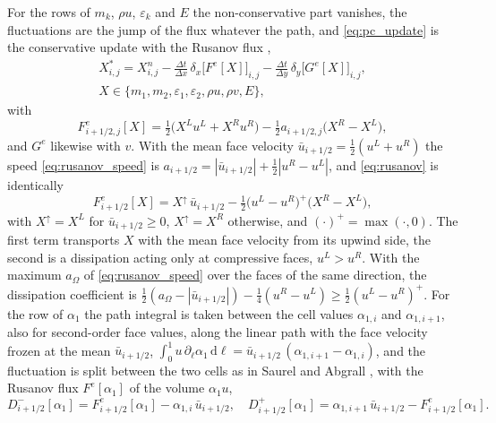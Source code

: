 For the rows of $m_k$, $\rho u$, $\varepsilon_k$ and $E$ the non-conservative part vanishes, the fluctuations are the jump of the flux
whatever the path, and \eqref{eq:pc_update} is the conservative update with the Rusanov flux
\cite{Rusanov1961},
\begin{equation}
\begin{gathered}
X^*_{i,j}=X^n_{i,j}-\frac{\Delta t}{\Delta x}\,\delta_x\big[F^e[X]\big]_{i,j}-\frac{\Delta t}{\Delta y}\,\delta_y\big[G^e[X]\big]_{i,j},\\
X\in\{m_1,m_2,\varepsilon_1,\varepsilon_2,\rho u,\rho v,E\},
\end{gathered}
\label{eq:explicit}
\end{equation}
with
\begin{equation}
F^e_{i+1/2,j}[X]=\tfrac12\big(X^Lu^L+X^Ru^R\big)-\tfrac12a_{i+1/2,j}\big(X^R-X^L\big),
\label{eq:rusanov}
\end{equation}
and $G^e$ likewise with $v$. With the mean face velocity $\bar u_{i+1/2}=\tfrac12(u^L+u^R)$ the speed \eqref{eq:rusanov_speed} is
$a_{i+1/2}=|\bar u_{i+1/2}|+\tfrac12|u^R-u^L|$, and \eqref{eq:rusanov} is identically
\begin{equation}
F^e_{i+1/2}[X]=X^{\uparrow}\,\bar u_{i+1/2}-\tfrac12\big(u^L-u^R\big)^+\big(X^R-X^L\big),
\label{eq:rusanov_upwind}
\end{equation}
with $X^\uparrow=X^L$ for $\bar u_{i+1/2}\ge0$, $X^\uparrow=X^R$ otherwise, and $(\cdot)^+=\max(\cdot,0)$. The first term transports $X$ with the mean face velocity
from its upwind side, the second is a dissipation acting only at compressive faces, $u^L>u^R$. With the maximum $a_\Omega$ of
\eqref{eq:rusanov_speed} over the faces of the same direction, the dissipation coefficient is
$\tfrac12(a_\Omega-|\bar u_{i+1/2}|)-\tfrac14(u^R-u^L)\ge\tfrac12(u^L-u^R)^+$.
For the row of $\alpha_1$ the path integral is taken between the cell values $\alpha_{1,i}$ and $\alpha_{1,i+1}$, also for second-order face
values, along the linear path with the face velocity frozen at the mean
$\bar u_{i+1/2}$, $\int_0^1u\,\partial_\ell\alpha_1\,\mathrm d\ell=\bar u_{i+1/2}\,(\alpha_{1,i+1}-\alpha_{1,i})$, and the fluctuation is split
between the two cells as in Saurel and Abgrall \cite{SaurelAbgrall1999a}, with the Rusanov flux $F^e[\alpha_1]$ of the volume
$\alpha_1u$,
\begin{equation}
D^-_{i+1/2}[\alpha_1]=F^e_{i+1/2}[\alpha_1]-\alpha_{1,i}\,\bar u_{i+1/2},\quad
D^+_{i+1/2}[\alpha_1]=\alpha_{1,i+1}\,\bar u_{i+1/2}-F^e_{i+1/2}[\alpha_1].
\label{eq:pc_rusanov}
\end{equation}
